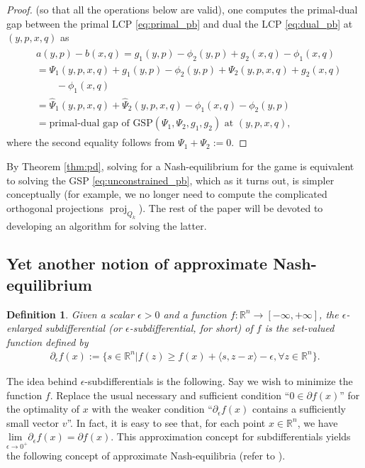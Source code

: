 \documentclass[a4paper,9pt]{extarticle}
\DeclareMathOperator{\proj}{proj}
\newtheorem{definition}{Definition}
\begin{document}
\begin{proof}
(so that all the operations below are valid),
one computes the primal-dual gap between the primal LCP
\eqref{eq:primal_pb} and dual the LCP \eqref{eq:dual_pb} at $(y, p, x, q)$ as
\begin{eqnarray*}
  \begin{split}
    &a(y, p) - b(x, q) = g_1(y, p) - \phi_2(y, p) + g_2(x, q) - \phi_1(x,
  q) \\
  &= \Psi_1(y, p, x, q) +  g_1(y, p) - \phi_2(y, p) + \Psi_2(y, p, x,
  q) + g_2(x, q) \\
  &\hspace{2em}- \phi_1(x, q)\\
  &= \hat{\Psi}_1(y, p, x, q) + \hat{\Psi}_2(y, p, x, q) - \phi_1(x,
  q) - \phi_2(y, p)\\
  &= \text{primal-dual gap of GSP}(\Psi_1, \Psi_2,
  g_1, g_2) \text{ at }(y, p, x, q),
  \end{split}
\end{eqnarray*}
where the second equality follows from %
$\Psi_1 + \Psi_2 := 0$.
\end{proof}


By Theorem \ref{thm:pd}, solving for a Nash-equilibrium for
the game is equivalent to solving the GSP
\eqref{eq:unconstrained_pb}, which as it turns out, is simpler
conceptually (for example, we no longer need to compute the
complicated orthogonal projections $\proj_{Q_k}$). The rest of the
paper will be devoted to developing an algorithm for solving the latter.



\subsection{Yet another notion of approximate Nash-equilibrium}
\begin{definition}
  Given a scalar $\epsilon > 0$ and a function $f:\mathbb{R}^n
  \rightarrow [-\infty,+\infty]$, the $\epsilon$-enlarged
  subdifferential (or
  $\epsilon$-subdifferential, for short) of $f$ is the set-valued
  function defined by
  \begin{eqnarray}
\partial_\epsilon f(x):= \{s \in \mathbb{R}^n | f(z)
\ge f(x) + \langle s, z - x\rangle - \epsilon,\forall z \in
\mathbb{R}^n\}.
\end{eqnarray}
\end{definition}
The idea behind $\epsilon$-subdifferentials is the following. Say we wish
to minimize the function $f$. Replace the usual necessary and sufficient
condition ``$0 \in \partial f(x)$'' for the optimality of $x$ with the
weaker condition ``$\partial_\epsilon f(x)$ contains a sufficiently
small vector $v$''. In fact, it is easy to see that, for each
point $x \in \mathbb{R}^n$, we have $\underset{\epsilon \rightarrow
  0^+}{\text{lim }}\partial_\epsilon f(x) = \partial f(x)$.
This approximation concept for subdifferentials yields the following
concept of approximate Nash-equilibria (refer to
\cite{he2013accelerating}).
\end{document}
